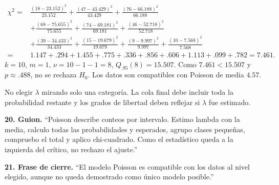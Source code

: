 \documentclass[11pt,a4paper]{article}
\newcommand{\cierre}[1]{\textbf{21. Frase de cierre.} ``#1''\par}
\begin{document}
\begin{align*}
\chi^2={}&\frac{(18-23.152)^2}{23.152}+\frac{(47-43.429)^2}{43.429}+\frac{(76-66.188)^2}{66.188}\\
&+\frac{(68-75.655)^2}{75.655}+\frac{(74-69.181)^2}{69.181}+\frac{(46-52.718)^2}{52.718}\\
&+\frac{(39-34.433)^2}{34.433}+\frac{(15-19.679)^2}{19.679}+\frac{(9-9.997)^2}{9.997}+\frac{(10-7.568)^2}{7.568}\\
={}&1.147+.294+1.455+.775+.336+.856+.606+1.113+.099+.782=7.461.
\end{align*}
$k=10$, $m=1$, $\nu=10-1-1=8$, $Q_{.95}(8)=15.507$. Como $7.461<15.507$ y $p\approx.488$, no se rechaza $H_0$. Los datos son compatibles con Poisson de media $4.57$.\par
\begin{errorbox}No elegir $\lambda$ mirando solo una categoría. La cola final debe incluir toda la probabilidad restante y los grados de libertad deben reflejar si $\lambda$ fue estimado.\end{errorbox}
\begin{oral}\textbf{20. Guion.} ``Poisson describe conteos por intervalo. Estimo lambda con la media, calculo todas las probabilidades y esperados, agrupo clases pequeñas, compruebo el total y aplico chi-cuadrado. Como el estadístico queda a la izquierda del crítico, no rechazo el ajuste.''\end{oral}
\cierre{El modelo Poisson es compatible con los datos al nivel elegido, aunque no queda demostrado como único modelo posible.}
\end{document}
